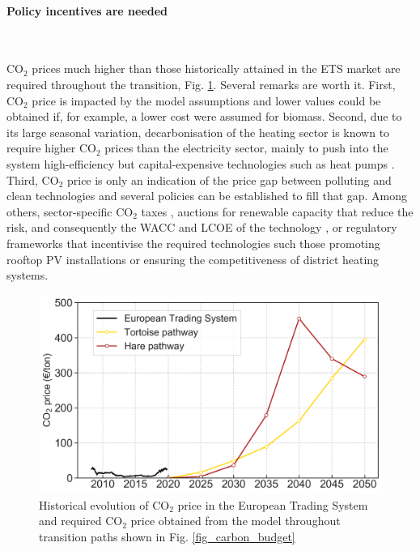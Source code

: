 \documentclass[5p]{elsarticle} %
\begin{document}
\paragraph{\textbf{Policy incentives are needed}} \

CO$_2$ prices much higher than those historically attained in the ETS market are required throughout the transition, Fig. \ref{fig_co2price}. Several remarks are worth it. First, CO$_2$ price is impacted by the model assumptions and lower values could be obtained if, for example, a lower cost were assumed for biomass. Second, due to its large seasonal variation, decarbonisation of the heating sector is known to require higher CO$_2$ prices than the electricity sector, mainly to push into the system high-efficiency but capital-expensive technologies such as heat pumps \cite{Brown_2018, Victoria_2019_storage}. Third, CO$_2$ price is only an indication of the price gap between polluting and clean technologies and several policies can be established to fill that gap. Among others, sector-specific CO$_2$ taxes \cite{Carbon_pricing_2019}, auctions for renewable capacity that reduce the risk, and consequently the WACC and LCOE of the technology \cite{Vartiainen_2019}, or regulatory frameworks that incentivise the required technologies such those promoting rooftop PV installations or ensuring the competitiveness of district heating systems.

\begin{figure}[!h]
\centering
\includegraphics[width=\columnwidth]{figures/co2_price.png}
\caption{Historical evolution of CO$_2$ price in the European Trading System \cite{ETS} and required CO$_2$ price obtained from the model throughout transition paths shown in Fig. \ref{fig_carbon_budget}} \label{fig_co2price} 
\end{figure}
\end{document}
